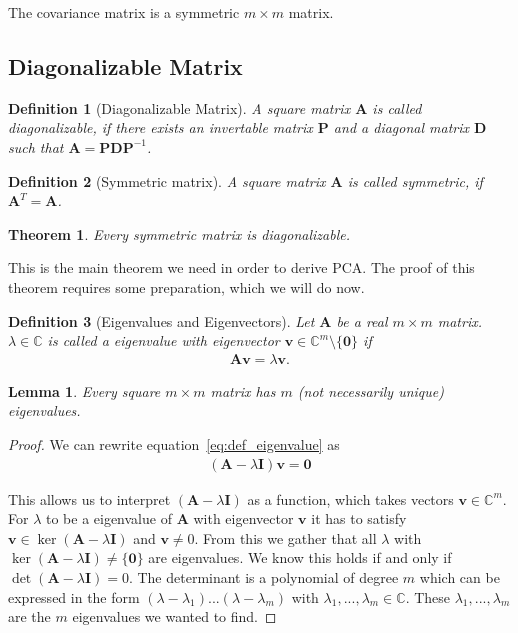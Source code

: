 \documentclass[a4paper]{IEEEtran}
\newtheorem{definition}{Definition}
\newtheorem{lemma}{Lemma}
\newtheorem{theorem}{Theorem}
\begin{document}
The covariance matrix is a symmetric $m\times m$ matrix.

\subsection{Diagonalizable Matrix}

\begin{definition}[Diagonalizable Matrix]
	A square matrix $\mathbf{A}$ is called \textit{diagonalizable}, if there exists an invertable matrix $\mathbf{P}$ and a diagonal matrix $\mathbf{D}$ such that $\mathbf{A} = \mathbf{P}\mathbf{D}\mathbf{P}^{-1}$.
\end{definition}

\begin{definition}[Symmetric matrix]
	A square matrix $\mathbf{A}$ is called \textit{symmetric}, if $\mathbf{A}^T = \mathbf{A}$.
\end{definition}

\begin{theorem}
	\label{th:symmetric_matrix_diagonalizable}
	Every symmetric matrix is diagonalizable.
\end{theorem}

This is the main theorem we need in order to derive PCA. The proof of this theorem requires some preparation, which we will do now.

\begin{definition}[Eigenvalues and Eigenvectors]
	Let $\mathbf{A}$ be a real $m\times m$ matrix. $\lambda \in \mathbb{C}$ is called a \textit{eigenvalue} with \textit{eigenvector} $\mathbf{v} \in \mathbb{C}^m\setminus\{\mathbf{0}\}$ if
	\begin{align}
		\label{eq:def_eigenvalue}
		\mathbf{Av} = \lambda \mathbf{v}.
	\end{align}
\end{definition}

\begin{lemma}
	\label{lem:existence_eigenvalues}
	Every square $m\times m$ matrix has $m$ (not necessarily unique) eigenvalues.
\end{lemma}

\begin{proof}
	We can rewrite equation~\ref{eq:def_eigenvalue} as
	\begin{align*}
		(\mathbf{A} - \lambda \mathbf{I})\mathbf{v} = \mathbf{0}
	\end{align*}
	
	This allows us to interpret $(\mathbf{A}-\lambda \mathbf{I})$ as a function, which takes vectors $\mathbf{v} \in \mathbb{C}^m$. For $\lambda$ to be a eigenvalue of $\mathbf{A}$ with eigenvector $\mathbf{v}$ it has to satisfy $\mathbf{v} \in \ker(\mathbf{A} - \lambda \mathbf{I})$ and $\mathbf{v} \neq 0$. From this we gather that all $\lambda$ with $\ker(\mathbf{A} - \lambda \mathbf{I}) \neq \{\mathbf{0}\}$ are eigenvalues. We know this holds if and only if $\det(\mathbf{A} - \lambda \mathbf{I}) = 0$. The determinant is a polynomial of degree $m$ which can be expressed in the form $(\lambda - \lambda_1)...(\lambda - \lambda_m)$ with $\lambda_1, ..., \lambda_m \in \mathbb{C}$. These $\lambda_1, ..., \lambda_m$ are the $m$ eigenvalues we wanted to find.
\end{proof}
\end{document}
